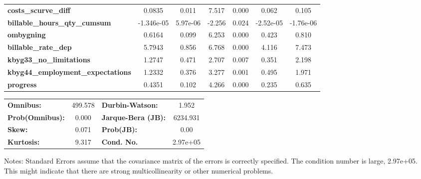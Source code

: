 \begin{center}
\begin{tabular}{lcccccc}
\textbf{costs\_scurve\_diff}              &       0.0835  &        0.011     &     7.517  &         0.000        &        0.062    &        0.105     \\
\textbf{billable\_hours\_qty\_cumsum}     &   -1.346e-05  &     5.97e-06     &    -2.256  &         0.024        &    -2.52e-05    &    -1.76e-06     \\
\textbf{ombygning}                        &       0.6164  &        0.099     &     6.253  &         0.000        &        0.423    &        0.810     \\
\textbf{billable\_rate\_dep}              &       5.7943  &        0.856     &     6.768  &         0.000        &        4.116    &        7.473     \\
\textbf{kbyg33\_no\_limitations}          &       1.2747  &        0.471     &     2.707  &         0.007        &        0.351    &        2.198     \\
\textbf{kbyg44\_employment\_expectations} &       1.2332  &        0.376     &     3.277  &         0.001        &        0.495    &        1.971     \\
\textbf{progress}                         &       0.4351  &        0.102     &     4.266  &         0.000        &        0.235    &        0.635     \\
\bottomrule
\end{tabular}
\begin{tabular}{lclc}
\textbf{Omnibus:}       & 499.578 & \textbf{  Durbin-Watson:     } &    1.952  \\
\textbf{Prob(Omnibus):} &   0.000 & \textbf{  Jarque-Bera (JB):  } & 6234.931  \\
\textbf{Skew:}          &   0.071 & \textbf{  Prob(JB):          } &     0.00  \\
\textbf{Kurtosis:}      &   9.317 & \textbf{  Cond. No.          } & 2.97e+05  \\
\bottomrule
\end{tabular}
\end{center}

Notes: \newline
 [1] Standard Errors assume that the covariance matrix of the errors is correctly specified. \newline
 [2] The condition number is large, 2.97e+05. This might indicate that there are \newline
 strong multicollinearity or other numerical problems.